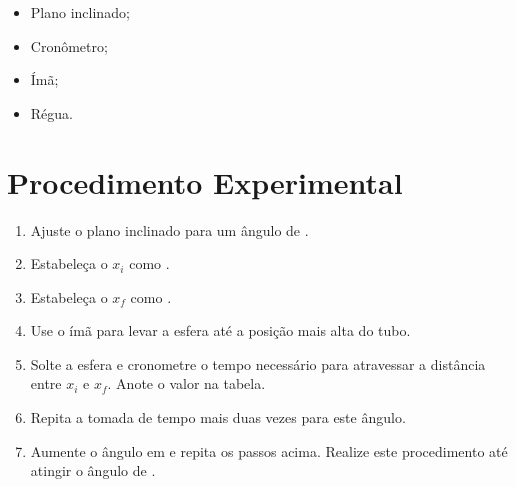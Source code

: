 \begin{itemize}
	\item Plano inclinado;
	\item Cronômetro;
	\item Ímã;
	\item Régua.
\end{itemize}

\section{Procedimento Experimental}

\begin{enumerate}
	\item Ajuste o plano inclinado para um ângulo de .
	\item Estabeleça o $x_i$ como .
	\item Estabeleça o $x_f$ como .
	\item Use o ímã para levar a esfera até a posição mais alta do tubo.
	\item Solte a esfera e cronometre o tempo necessário para atravessar a distância entre $x_i$ e $x_f$. Anote o valor na tabela.
	\item Repita a tomada de tempo mais duas vezes para este ângulo.
	\item Aumente o ângulo em  e repita os passos acima. Realize este procedimento até atingir o ângulo de .
\end{enumerate}

\cleardoublepage


\vspace{15mm}

